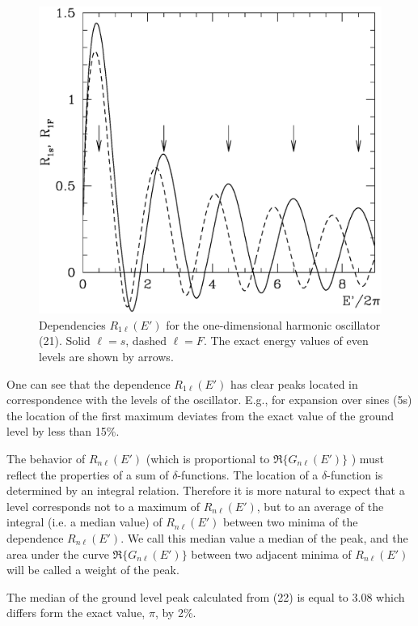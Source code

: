 \documentclass[11pt]{article}
\begin{document}
\begin{figure}[H] 
    \begin{center}
    \includegraphics[width=0.8\linewidth]{rsf1harm.eps}
    \caption{\label{f1} Dependencies $R_{1\ell}(E')$ for
the one-dimensional harmonic oscillator (21). Solid 
$\ell=s$, dashed $\ell=F$. The exact energy values of even levels are shown by arrows.
             } 
   \end{center}
\end{figure}



One can see that the dependence 
$R_{1\ell}(E')$ has clear peaks located in correspondence with the levels of the oscillator. E.g., for expansion over sines (5s)  the location of the first maximum
deviates from the exact value of the ground level by less than 15\%.

The behavior of $R_{n\ell}(E')$ (which is proportional to $\Re\{G_{n\ell}(E')\}$ )
must reflect the properties of a sum of 
$\delta$-functions. The location of a 
$\delta$-function is determined by an integral relation. Therefore it is more natural to expect that a level corresponds not to a maximum of  $R_{n\ell}(E')$,
but to an average of the integral (i.e. a median value) of  $R_{n\ell}(E')$ between
two minima of the dependence  $R_{n\ell}(E')$. We call this median value 
a median of the peak, and the area under the curve  $\Re\{G_{n\ell}(E')\}$ between two adjacent minima of  $R_{n\ell}(E')$  will be called a weight of the peak.

The median of the ground level peak calculated from (22) is equal to $3.08$
which differs form the exact value,  $\pi$, by 2\%.
\end{document}
